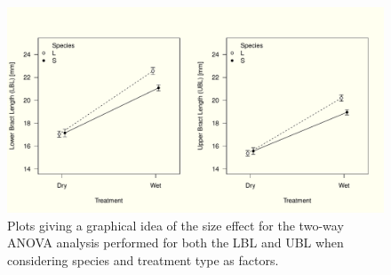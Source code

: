 \documentclass{article}
\begin{document}
\begin{figure}[H]
\centering
  \includegraphics[scale=0.5]{anova_lbl.pdf}
\caption{Plots giving a graphical idea of the size effect for the two-way ANOVA analysis performed for both the LBL and UBL when considering species and treatment type as factors.}
  \label{fig:aovi1}
\end{figure}
\end{document}
